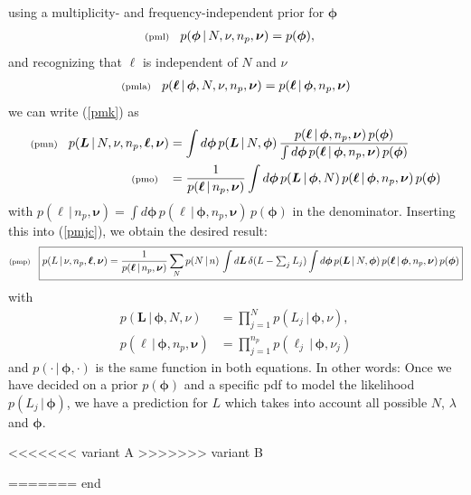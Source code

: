 \documentclass[11pt]{article}
\newcommand{\lleq}[1]{\label{#1} }
\renewcommand{\lleq}[1]{\label{#1} {\scriptstyle {\rm (#1)}} \hspace*{2ex} }
\newcommand{\cond}{\,|\,}
\newcommand{\bml}{{\bm{\ell}}}
\newcommand{\bmL}{{\bm{L}}}
\newcommand{\bmphi}{{\bm{\phi}}}
\newcommand{\bmnu}{{\bm{\nu}}}
\newcommand{\npack}{n_p}
\begin{document}
using a multiplicity- and frequency-independent prior for $\bmphi$
\begin{align}
  \lleq{pml}
  p(\bmphi\cond N,\nu, \npack,\bmnu) &= p(\bmphi),
\end{align}
and recognizing that $\bml$ is independent of $N$ and $\nu$
\begin{align}
  \lleq{pmla}
  p(\bml\cond \bmphi,N,\nu, \npack,\bmnu) = p(\bml\cond \bmphi,\npack,\bmnu)
\end{align}
we can write (\ref{pmk}) as
\begin{align}
  \lleq{pmn}
  p(\bmL\cond N,\nu, \npack,\bml, \bmnu)
  &= \int d\bmphi\, p(\bmL\cond N,\bmphi)\, %
  \frac{p(\bml\cond \bmphi, \npack, \bmnu)\,p(\bmphi)} %
  {\int d\bmphi\,p(\bml\cond \bmphi,\npack,\bmnu)\,p(\bmphi)} \\
  \lleq{pmo}
  &= \frac{1}  {p(\bml\cond \npack, \bmnu)} %
  \int d\bmphi\, p(\bmL\cond \bmphi, N)\, %
  p(\bml\cond \bmphi, \npack,\bmnu)\,p(\bmphi)
\end{align}
with $p(\bml\cond \npack, \bmnu) = \int d\bmphi\, p(\bml\cond \bmphi,
\npack,\bmnu)\,p(\bmphi)$ in the denominator.  Inserting this into
(\ref{pmjc}), we obtain the desired result:
\begin{equation}
  \lleq{pmp}
  \boxed{
  p(L\cond \nu, \npack,\bml, \bmnu)
  = \frac{1}{p(\bml\cond \npack, \bmnu)}
  \sum_N p(N\cond n)\,\int d\bmL\,\delta(L - \textstyle\sum_j L_j)
  \displaystyle\int d\bmphi\,p(\bmL\cond N,\bmphi) \, p(\bml\cond \bmphi,\npack,\bmnu)
  \, p(\bmphi)
  }
\end{equation}
with
\begin{align}
  p(\bmL\cond \bmphi, N, \nu) &= \prod_{j=1}^N p(L_j\cond \bmphi, \nu), \\
  p(\bml\cond \bmphi,\npack,\bmnu) &= \prod_{j=1}^{\npack} p(\ell_j\cond \bmphi, \nu_j)
\end{align}
and $p(\cdot \cond \bmphi, \cdot)$ is the same function in both equations.
In other words: Once we have decided on a prior $p(\bmphi)$ and a
specific pdf to model the likelihood $p(L_j\cond \bmphi)$, we have a
prediction for $L$ which takes into account all possible $N$,
$\lambda$ and $\bmphi$.

<<<<<<< variant A
>>>>>>> variant B

======= end
\end{document}
